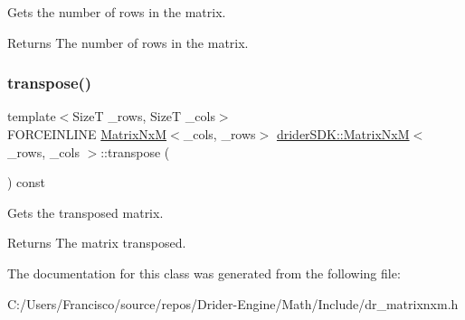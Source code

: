 Gets the number of rows in the matrix.

\begin{DoxyReturn}{Returns}
The number of rows in the matrix. 
\end{DoxyReturn}
\mbox{\label{classdrider_s_d_k_1_1_matrix_nx_m_a905c8727dad2b8dc8c0e90a87489dd9a}} 
\subsubsection{\texorpdfstring{transpose()}{transpose()}}
{\footnotesize\ttfamily template$<$SizeT \+\_\+rows, SizeT \+\_\+cols$>$ \\
F\+O\+R\+C\+E\+I\+N\+L\+I\+NE \hyperlink{classdrider_s_d_k_1_1_matrix_nx_m}{Matrix\+NxM}$<$\+\_\+cols, \+\_\+rows$>$ \hyperlink{classdrider_s_d_k_1_1_matrix_nx_m}{drider\+S\+D\+K\+::\+Matrix\+NxM}$<$ \+\_\+rows, \+\_\+cols $>$\+::transpose (\begin{DoxyParamCaption}{ }\end{DoxyParamCaption}) const\hspace{0.3cm}{\ttfamily [inline]}}

Gets the transposed matrix.

\begin{DoxyReturn}{Returns}
The matrix transposed. 
\end{DoxyReturn}


The documentation for this class was generated from the following file\+:\begin{DoxyCompactItemize}
\item 
C\+:/\+Users/\+Francisco/source/repos/\+Drider-\/\+Engine/\+Math/\+Include/dr\+\_\+matrixnxm.\+h\end{DoxyCompactItemize}
